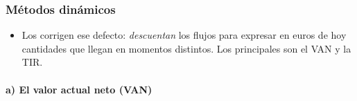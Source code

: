 \documentclass[11pt]{article}
\begin{document}
\subsubsection{Métodos dinámicos}\label{sec:dinamicos}

\begin{itemize}
\item Los  corrigen ese defecto: \emph{descuentan} los flujos para expresar en euros de hoy cantidades que llegan en momentos distintos. Los principales son el VAN y la TIR.
\end{itemize}

\paragraph{a) El valor actual neto (VAN)}
\end{document}
